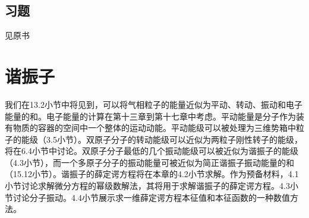 \documentclass[12pt,a4paper,openany]{ctexbook}
\begin{document}
\section*{习题}
见原书

\chapter{谐振子}
\begin{flushleft}
    \setlength{\parindent}{2em}
我们在13.2小节中将见到，可以将气相粒子的能量近似为平动、转动、振动和电子能量的和。电子能量的计算在第十三章到第十七章中考虑。平动能量是分子作为装有物质的容器的空间中一个整体的运动动能。平动能级可以被处理为三维势箱中粒子的能级（3.5小节）。双原子分子的转动能级可以近似为两粒子刚性转子的能级，将在6.4小节中讨论。双原子分子最低的几个振动能级可以被近似为谐振子的能级（4.3小节），而一个多原子分子的振动能量可被近似为简正谐振子振动能量的和（15.12小节）。谐振子的薛定谔方程将在本章的4.2小节求解。作为预备材料，4.1小节讨论求解微分方程的幂级数解法，其将用于求解谐振子的薛定谔方程。4.3小节讨论分子振动。4.4小节展示求一维薛定谔方程本征值和本征函数的一种数值方法。
\end{flushleft}
\end{document}
